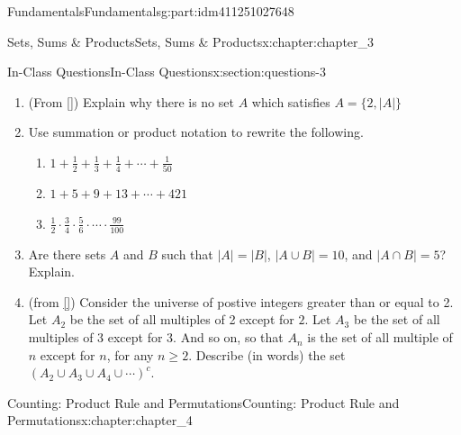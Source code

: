 \documentclass[oneside,10pt,]{book}
\newcommand{\xreffont}{\relax}
\numberwithin{equation}{section}
\newcommand{\card}[1]{\left| #1 \right|}
\begin{document}
\begin{partptx}{Fundamentals}{}{Fundamentals}{}{}{g:part:idm411251027648}
\begin{chapterptx}{Sets, Sums \& Products}{}{Sets, Sums \& Products}{}{}{x:chapter:chapter_3}
\begin{sectionptx}{In-Class Questions}{}{In-Class Questions}{}{}{x:section:questions-3}
\begin{enumerate}[label=\arabic*.]
\begin{enumerate}[label=(\alph*)]
\item{}A set \(A \subseteq \mathbb{N}\) with \(\lvert A \rvert = 10\) such that \(X - A = \{10, 12, 14\}\).%
\item{}A set \(B \in \mathcal{P}(X)\) with \(\lvert B\rvert = 5\).%
\item{}A set \(C \subseteq \mathcal{P}(X)\) with \(\lvert C\rvert = 5\).%
\item{}A set \(D \subseteq X \times X\) with \(\lvert D\rvert = 5\).%
\item{}A set \(E \subseteq X\) such that \(\lvert E\rvert \in E\).%
\end{enumerate}
%
\item{}(From \hyperlink{x:biblio:biblio-levin-2020}{[{\xreffont 3}]}) Explain why there is no set \(A\) which satisfies \(A = \{2, \card{A}\}\)%
\item{}Use summation or product notation to rewrite the following.%
\begin{enumerate}[label=(\alph*)]
\item{}\(1 + \frac{1}{2} + \frac{1}{3}+ \frac{1}{4}+ \cdots + \frac{1}{50}\)%
\item{}\(1 + 5 + 9 + 13 + \cdots + 421\)%
\item{}\(\frac{1}{2}\cdot \frac{3}{4}\cdot \frac{5}{6}\cdot \cdots 			 
\cdot\frac{99}{100}\)%
\end{enumerate}
%
\item{}Are there sets \(A\) and \(B\) such that \(|A| = |B|\), \(|A\cup B| = 10\), and \(|A\cap B| = 5\)?  Explain.%
\item{}(from \hyperlink{x:biblio:biblio-levin-2020}{[{\xreffont 3}]}) Consider the universe of postive integers greater than or equal to 2. Let \(A_2\) be the set of all multiples of 2 except for \(2\). Let \(A_3\) be the set of all multiples of 3 except for 3. And so on, so that \(A_n\) is the set of all multiple of \(n\) except for \(n\), for any \(n \ge 2\). Describe (in words) the set \(\left(A_2 \cup A_3 \cup A_4 \cup \cdots \right)^c\).%
\end{enumerate}
%
\end{sectionptx}
\end{chapterptx}
%
\typeout{************************************************}
\typeout{************************************************}
%
\begin{chapterptx}{Counting: Product Rule and Permutations}{}{Counting: Product Rule and Permutations}{}{}{x:chapter:chapter_4}

\end{chapterptx}
\end{partptx}
\end{document}
